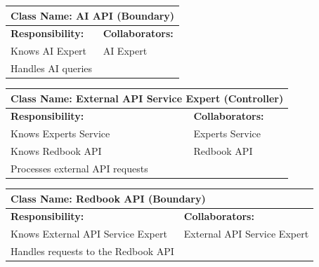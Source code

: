 \documentclass[]{article}
\begin{document}
\begin{table}[H]
  \centering
  \renewcommand{\arraystretch}{1.3} %
  \begin{tabular}{|p{7.5cm}|p{7.5cm}|}
    \hline
    \multicolumn{2}{|l|}{\textbf{Class Name: AI API (Boundary)}} \\
    \hline
    \textbf{Responsibility:} & \textbf{Collaborators:}           \\
    \hline
    Knows AI Expert          & AI Expert                         \\
    Handles AI queries       &                                   \\
    \hline
  \end{tabular}
\end{table}
\begin{table}[H]
  \centering
  \renewcommand{\arraystretch}{1.3} %
  \begin{tabular}{|p{7.5cm}|p{7.5cm}|}
    \hline
    \multicolumn{2}{|l|}{\textbf{Class Name: External API Service Expert (Controller)}} \\
    \hline
    \textbf{Responsibility:}        & \textbf{Collaborators:}                           \\
    \hline
    Knows Experts Service           & Experts Service                                   \\
    Knows Redbook API               & Redbook API                                       \\
    Processes external API requests &                                                   \\
    \hline
  \end{tabular}
\end{table}
\begin{table}[H]
  \centering
  \renewcommand{\arraystretch}{1.3} %
  \begin{tabular}{|p{7.5cm}|p{7.5cm}|}
    \hline
    \multicolumn{2}{|l|}{\textbf{Class Name: Redbook API (Boundary)}} \\
    \hline
    \textbf{Responsibility:}            & \textbf{Collaborators:}     \\
    \hline
    Knows External API Service Expert   & External API Service Expert \\
    Handles requests to the Redbook API &                             \\
    \hline
  \end{tabular}
\end{table}
\end{document}
